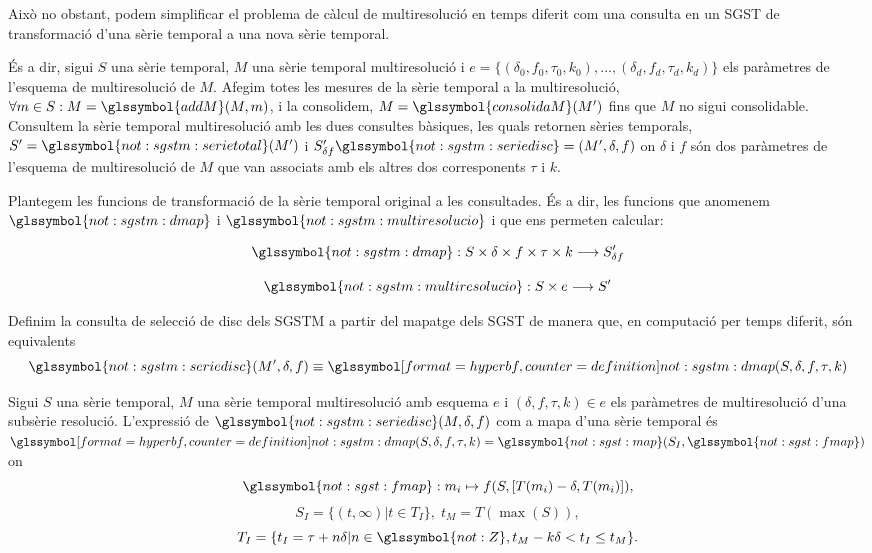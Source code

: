 Això no obstant, podem simplificar el problema de càlcul de
multiresolució en temps diferit com una consulta en un \gls{SGST} de
transformació d'una sèrie temporal a una nova sèrie temporal.


És a dir, sigui $S$ una sèrie temporal, $M$ una sèrie temporal
multiresolució i $e = \{ (\delta_0,f_0,\tau_0,k_0), \ldots,
(\delta_d,f_d,\tau_d,k_d)\}$ els paràmetres de l'esquema de
multiresolució de $M$. Afegim totes les mesures de la sèrie temporal a
la multiresolució, $\forall m \in S:
M=\glssymbol{addM}(M,m)$, i la consolidem, $M=\glssymbol{consolidaM}(M')$ fins que
$M$ no sigui consolidable. Consultem la sèrie temporal multiresolució
amb les dues consultes bàsiques, les quals retornen sèries temporals,
$S'=\glssymbol{not:sgstm:serietotal}(M')$ i $S_{\delta
  f}'\glssymbol{not:sgstm:seriedisc}=(M',\delta,f)$ on $\delta$ i $f$
són dos paràmetres de l'esquema de multiresolució de $M$ que van
associats amb els altres dos corresponents $\tau$ i $k$.



Plantegem les funcions de transformació de la sèrie temporal original
a les consultades. És a dir, les funcions que anomenem
$\glssymbol{not:sgstm:dmap}$ i $\glssymbol{not:sgstm:multiresolucio}$
i que ens permeten calcular:

\[
\glssymbol{not:sgstm:dmap}: S \times \delta \times f \times \tau \times k \longrightarrow
S'_{\delta f}
\]


\[
 \glssymbol{not:sgstm:multiresolucio}: S \times e  \longrightarrow S'
\]



Definim la consulta de selecció de disc dels \gls{SGSTM} a partir del
mapatge dels \gls{SGST} de manera que, en computació per temps
diferit, són equivalents
\[
\glssymbol{not:sgstm:seriedisc}(M',\delta,f) \equiv
\glssymboldef{not:sgstm:dmap}(S,\delta,f,\tau,k)
\]


\begin{definition}
  Sigui $S$ una sèrie temporal, $M$ una sèrie temporal multiresolució
  amb esquema $e$ i $(\delta,f,\tau,k)\in e$ els paràmetres de
  multiresolució d'una subsèrie resolució. L'expressió de
  $\glssymbol{not:sgstm:seriedisc}(M,\delta,f)$ com a mapa d'una sèrie
  temporal és $\glssymboldef{not:sgstm:dmap}(S,\delta,f,\tau,k)=
  \glssymbol{not:sgst:map}(S_I,\glssymbol{not:sgst:fmap})$ on
  \[
  \glssymbol{not:sgst:fmap}: m_i\mapsto f(S, [T(m_i)-\delta,T(m_i)]),
  \]
  \[
  S_I = \{ (t,\infty) | t\in T_I  \},\;  t_M = T(\max(S)),
  \]
  \[
  T_I = \{ t_I = \tau+n\delta | n\in\glssymbol{not:Z}, t_M - k\delta <
  t_I \leq t_M \}.
  \]
\end{definition}



